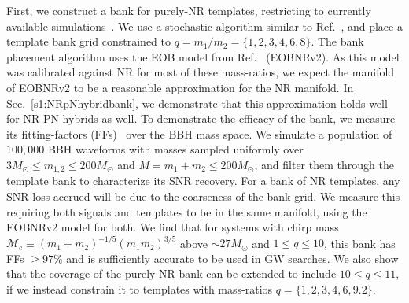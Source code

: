 First, we construct a bank for purely-NR templates, restricting to
currently available simulations~\cite{MacDonald:2012mp,Mroue:2012kv,
Buchman:2012dw,Mroue:2013xna,Mroue:2012kv}. We use a stochastic algorithm 
similar to Ref.~\cite{Harry:2009ea,Ajith:2012mn,Manca:2009xw}, 
and place a template bank grid
constrained to $q=m_1/m_2=\{1,2,3,4,6,8\}$. The bank placement 
algorithm uses the EOB model from Ref.~\cite{BuonannoEOBv2Main} (EOBNRv2).
As this model was calibrated against NR for most of these mass-ratios, 
we expect the manifold of EOBNRv2 to be a reasonable approximation 
for the NR manifold. In Sec.~\ref{s1:NRpNhybridbank}, we demonstrate that
this approximation holds well for NR-PN hybrids as well.
To demonstrate the efficacy of the 
bank, we measure its fitting-factors (FFs)~\cite{FittingFactorApostolatos} over
the BBH mass space. We simulate a population of $100,000$ BBH waveforms with
masses sampled uniformly over 
$3M_\odot\leq m_{1,2}\leq 200M_\odot$ and $M=m_1+m_2\leq 200M_\odot$, and filter
them through the template bank to characterize its SNR recovery. For a
bank of NR templates, any SNR loss accrued will be due to the coarseness
of the bank grid. We measure this requiring both signals and templates
to be in the same manifold, using the EOBNRv2 model for both. We find 
that for systems with chirp mass 
$\mathcal{M}_c \equiv (m_1 + m_2)^{-1/5} (m_1 m_2)^{3/5}$ above 
$\sim 27M_{\odot}$ and $1\leq q\leq 10$, this bank has FFs $\geq 97\%$ and
is sufficiently accurate to be used in GW searches.
We also show that the coverage of the purely-NR bank can be extended to
include $10\leq q\leq 11$, if we instead constrain it to templates with
mass-ratios $q=\{1,2,3,4,6,9.2\}$.

